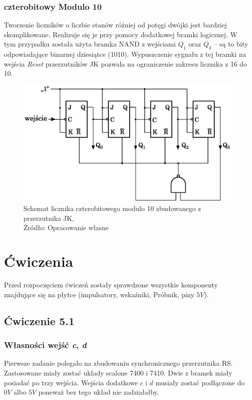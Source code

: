 \documentclass{article}
\begin{document}
      \subsubsection{czterobitowy Modulo 10}
        Tworzenie liczników o liczbie stanów różniej od potęgi dwójki jest bardziej skomplikowane. Realizuje się je przy pomocy dodatkowej bramki logicznej. W tym przypadku została użyta bramka NAND z wejściami $Q_1$ oraz $Q_3$ -- są to bity odpowiadające binarnej dziesiątce (1010). Wypuszczenie sygnału z tej bramki na wejścia \textit{Reset} przerzutników JK pozwala na ograniczenie zakresu licznika z 16 do 10.
        \begin{figure}[!ht]
          \centering
          \includegraphics[scale=0.55]{grafiki/Licznik_JK_mod_10.eps}
          \caption{Schemat licznika czterobitowego modulo 10 zbudowanego z przerzutnika JK,
          \\Źródło: Opracowanie własne}
          \label{fig4:mod10}
        \end{figure}

  \section{Ćwiczenia}
        Przed rozpoczęciem ćwiczeń zostały sprawdzone wszystkie komponenty znajdujące się na płytce (impulsatory, wskaźniki, Próbnik, piny $5V$).
    \subsection{Ćwiczenie 5.1}
      \subsubsection{Własności wejść \textit{c}, \textit{d}}
        Pierwsze zadanie polegało na zbudowaniu synchronicznego przerzutnika RS. Zastosowane miały zostać układy scalone 7400 i 7410. Dwie z bramek miały posiadać po trzy wejścia. Wejścia dodatkowe $c$ i $d$ musiały zostać podłączone do $0V$ albo $5V$ poneważ bez tego układ nie zadziałałby.
\end{document}
